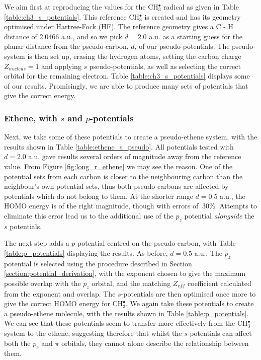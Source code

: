\documentclass[aip]{revtex4-1}
\begin{document}
We aim first at reproducing the values for the CH\(^{\bullet}_{3}\) radical as given in Table \ref{table:ch3_s_potentials}. 
This reference CH\(^{\bullet}_{3}\) is created and has its geometry optimised under Hartree-Fock (HF). The reference geometry gives a C - H distance of 2.0466 a.u., and so we pick \(d = 2.0\) a.u. as a starting guess for the planar distance from the pseudo-carbon, \(d\), of our pseudo-potentials. The pseudo-system is then set up, erasing the hydrogen atoms, setting the carbon charge \(Z_{nucleus} = 1\) and applying \(s\) pseudo-potentials, as well as selecting the correct orbital for the remaining electron. Table \ref{table:ch3_s_potentials} displays some of our results. Promisingly, we are able to produce many sets of potentials that give the correct energy.

\subsubsection{Ethene, with \(s\) and \(p\)-potentials}

Next, we take some of these potentials to create a pseudo-ethene system, with the results shown in Table \ref{table:ethene_s_pseudo}. All potentials tested with \(d = 2.0\) a.u. gave results several orders of magnitude away from the reference value. From Figure \ref{fig:long_r_ethene} we may see the reason. One of the potential sets from each carbon is closer to the neighbouring carbon than the neighbour's own potential sets, thus both pseudo-carbons are affected by potentials which do not belong to them. At the shorter range \(d = 0.5\) a.u., the HOMO energy is of the right magnitude, though with errors of \(~ 30\%\). Attempts to eliminate this error lead us to the additional use of the \(p_{z}\) potential \textit{alongside} the \(s\) potentials.

The next step adds a \(p\)-potential centred on the pseudo-carbon, with Table \ref{table:p_potentials} displaying the results. As before, \(d = 0.5\) a.u.. The \(p_{z}\) potential is selected using the procedure described in Section \ref{section:potential_derivation}, with the exponent chosen to give the maximum possible overlap with the \(p_{z}\) orbital, and the matching \(Z_{eff}\) coefficient calculated from the exponent and overlap. The \(s\)-potentials are then optimised once more to give the correct HOMO energy for CH\(^{\bullet}_{3}\). We again take these potentials to create a pseudo-ethene molecule, with the results shown in Table \ref{table:p_potentials}. We can see that these potentials seem to transfer more effectively from the CH\(^{\bullet}_{3}\) system to the ethene, suggesting therefore that whilst the \(s\)-potentials can affect both the \(p_{z}\) and \(\pi\) orbitals, they 
cannot alone describe the relationship between them.
\end{document}

